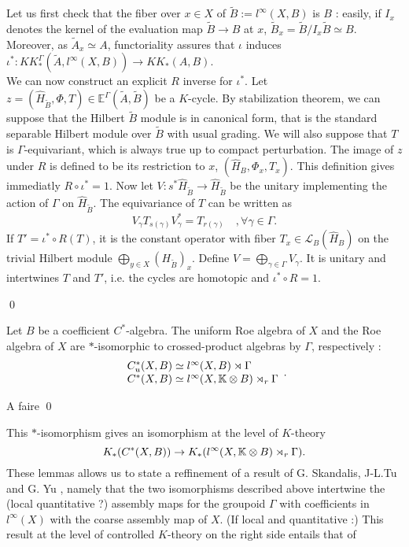 \begin{dem}
Let us first check that the fiber over $x\in X$ of $\tilde B :=l^\infty(X,B)$ is $B$ : easily, if $I_x$ denotes the kernel of the evaluation map $\tilde B \rightarrow B$ at $x$, $\tilde B_x = \tilde B / I_x \tilde B\simeq B $. Moreover, as $\tilde A_x \simeq A$, functoriality assures that $\iota$ induces $\iota^* : KK_*^\Gamma(\tilde A, l^\infty(X, B))\rightarrow KK_*(A, B)$.\\

We can now construct an explicit $R$ inverse for $\iota^*$. Let $z=(\hat H_{\tilde B},\Phi, T)\in \mathbb E^\Gamma(\tilde A,\tilde B)$ be a $K$-cycle. By stabilization theorem, we can suppose that the Hilbert $\tilde B$ module is in canonical form, that is the standard separable Hilbert module over $\tilde B$ with usual grading. We will also suppose that $T$ is $\Gamma$-equivariant, which is always true up to compact perturbation. The image of $z$ under $R$ is defined to be its restriction to $x$, $(\hat H_B,\Phi_x,T_x)$. This definition gives immediatly $R\circ \iota^* = 1$. Now let $V : s^* \hat H_{\tilde B}\rightarrow \hat H_{\tilde B}$ be the unitary implementing the action of $\Gamma$ on $\hat H_{\tilde B}$. The equivariance of $T$ can be written as 
\[V_\gamma T_{s(\gamma)} V_\gamma^* = T_{r(\gamma)}\quad,\forall \gamma \in \Gamma. \]
If $T' = \iota^*\circ R(T)$, it is the constant operator with fiber $T_x\in \mathcal L_B(\hat H_B)$ on the trivial Hilbert module $\bigoplus_{y\in X}(H_{\tilde B})_x $. Define $V=\bigoplus_{\gamma \in \Gamma} V_\gamma$. It is unitary and intertwines $T$ and $T'$, i.e. the cycles are homotopic and $\iota^*\circ R = 1$.

\qed
\end{dem}

\begin{lem}
Let $B$ be a coefficient $C^*$-algebra. The uniform Roe algebra of $X$  and the Roe algebra of $X$ are $*$-isomorphic to crossed-product algebras by $\Gamma$, respectively : 
\[\begin{array}{ll} C_u^* (X,B) \simeq l^\infty(X,B) \rtimes \Gamma \\ C^* (X,B) \simeq l^\infty(X,\mathbb K\otimes B) \rtimes_r \Gamma \end{array}.\]
\end{lem}

\begin{dem}
A faire
\qed
\end{dem}

This $*$-isomorphism gives an isomorphism at the level of $K$-theory 
\[ K_*(C^* (X,B))\rightarrow K_*(l^\infty(X,\mathbb K\otimes B)\rtimes_r \Gamma).\]
These lemmas allows us to state a reffinement of a result of G. Skandalis, J-L.Tu and G. Yu \cite{SkTuYu}, namely that the two isomorphisms described above intertwine the (local quantitative ?) assembly maps for the groupoid $\Gamma$ with coefficients in $l^\infty(X)$ with the coarse assembly map of $X$. (If local and quantitative :) This result at the level of controlled $K$-theory on the right side entails that of \cite{SkTuYu}

